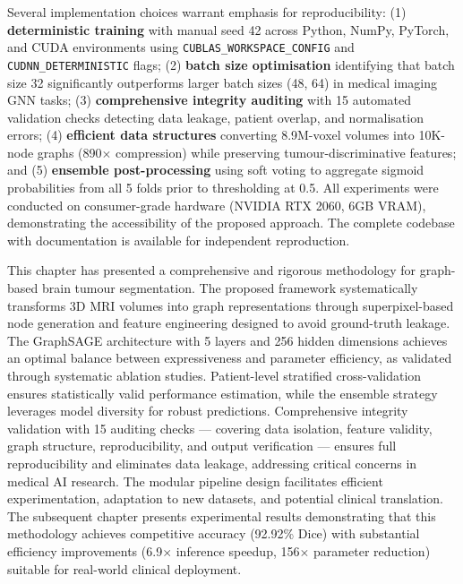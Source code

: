 Several implementation choices warrant emphasis for reproducibility: (1) \textbf{deterministic training} with manual seed 42 across Python, NumPy, PyTorch, and CUDA environments using \texttt{CUBLAS\_WORKSPACE\_CONFIG} and \texttt{CUDNN\_DETERMINISTIC} flags; (2) \textbf{batch size optimisation} identifying that batch size 32 significantly outperforms larger batch sizes (48, 64) in medical imaging GNN tasks; (3) \textbf{comprehensive integrity auditing} with 15 automated validation checks detecting data leakage, patient overlap, and normalisation errors; (4) \textbf{efficient data structures} converting 8.9M-voxel volumes into 10K-node graphs (890$\times$ compression) while preserving tumour-discriminative features; and (5) \textbf{ensemble post-processing} using soft voting to aggregate sigmoid probabilities from all 5 folds prior to thresholding at 0.5. All experiments were conducted on consumer-grade hardware (NVIDIA RTX 2060, 6GB VRAM), demonstrating the accessibility of the proposed approach. The complete codebase with documentation is available for independent reproduction.

\vspace{5mm}

This chapter has presented a comprehensive and rigorous methodology for graph-based brain tumour segmentation. The proposed framework systematically transforms 3D MRI volumes into graph representations through superpixel-based node generation and feature engineering designed to avoid ground-truth leakage. The GraphSAGE architecture with 5 layers and 256 hidden dimensions achieves an optimal balance between expressiveness and parameter efficiency, as validated through systematic ablation studies. Patient-level stratified cross-validation ensures statistically valid performance estimation, while the ensemble strategy leverages model diversity for robust predictions. Comprehensive integrity validation with 15 auditing checks — covering data isolation, feature validity, graph structure, reproducibility, and output verification — ensures full reproducibility and eliminates data leakage, addressing critical concerns in medical AI research. The modular pipeline design facilitates efficient experimentation, adaptation to new datasets, and potential clinical translation. The subsequent chapter presents experimental results demonstrating that this methodology achieves competitive accuracy (92.92\% Dice) with substantial efficiency improvements (6.9$\times$ inference speedup, 156$\times$ parameter reduction) suitable for real-world clinical deployment.

\clearpage

